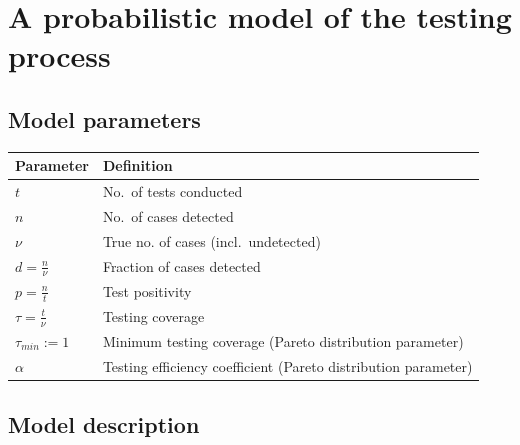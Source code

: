 \documentclass[
]{article}
\begin{document}
\hypertarget{a-probabilistic-model-of-the-testing-process}{%
\section{A probabilistic model of the testing
process}\label{a-probabilistic-model-of-the-testing-process}}

\hypertarget{model-parameters}{%
\subsection{Model parameters}\label{model-parameters}}

\bigskip

\begin{longtable}[]{@{}ll@{}}
\toprule
Parameter & Definition\tabularnewline
\midrule
\endhead
\(t\) & No.~of tests conducted\tabularnewline
\(n\) & No.~of cases detected\tabularnewline
\(\nu\) & True no. of cases (incl.~undetected)\tabularnewline
\(d = \frac{n}{\nu}\) & Fraction of cases detected\tabularnewline
\(p = \frac{n}{t}\) & Test positivity\tabularnewline
\(\tau = \frac{t}{\nu}\) & Testing coverage\tabularnewline
\(\tau_{min} := 1\) & Minimum testing coverage (Pareto distribution
parameter)\tabularnewline
\(\alpha\) & Testing efficiency coefficient (Pareto distribution
parameter)\tabularnewline
\bottomrule
\end{longtable}

\bigskip

\hypertarget{model-description}{%
\subsection{Model description}\label{model-description}}
\end{document}
